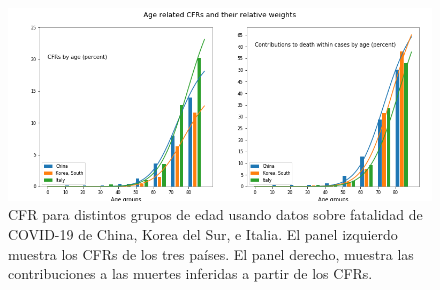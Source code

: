 \begin{figure}[h]
\caption{CFR para distintos grupos de edad usando datos sobre fatalidad de COVID-19 de China, Korea del Sur, e Italia. El panel izquierdo muestra los CFRs de los tres países. El panel derecho, muestra las contribuciones a las muertes inferidas a partir de los CFRs. } \label{cfrPDEdadChinaKSItalia}
\begin{center}
    \includegraphics[width=\textwidth]{../tsam_Covid19_figures/tsam_Covid19_JHU_cfr+propDeathCases_ByAge_China+SKorea+Italy_OneFigure}
    \end{center}
\end{figure}


